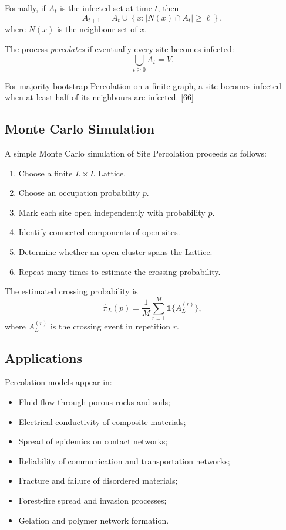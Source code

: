 \documentclass[a4paper, 10pt, onepage]{elegantbook}
\begin{document}
{Formally, if \(A_t\) is the infected set at time \(t\), then
\[
A_{t+1}
=
A_t
\cup
\left\{
x:
|N(x)\cap A_t|\ge\ell
\right\},
\]
where \(N(x)\) is the neighbour set of \(x\).

The process \emph{percolates} if eventually every site becomes infected:
\[
\bigcup_{t\ge0}A_t=V.
\]

For majority bootstrap Percolation on a finite graph, a site becomes infected
when at least half of its neighbours are infected. [66]

\subsection{Monte Carlo Simulation}

A simple Monte Carlo simulation of Site Percolation proceeds as follows:

\begin{enumerate}
\item Choose a finite \(L\times L\) Lattice.
\item Choose an occupation probability \(p\).
\item Mark each site open independently with probability \(p\).
\item Identify connected components of open sites.
\item Determine whether an open cluster spans the Lattice.
\item Repeat many times to estimate the crossing probability.
\end{enumerate}

The estimated crossing probability is
\[
\widehat\pi_L(p)
=
\frac{1}{M}
\sum_{r=1}^{M}
\mathbf 1\{A_L^{(r)}\},
\]
where \(A_L^{(r)}\) is the crossing event in repetition \(r\).

\subsection{Applications}

Percolation models appear in:

\begin{itemize}
\item Fluid flow through porous rocks and soils;
\item Electrical conductivity of composite materials;
\item Spread of epidemics on contact networks;
\item Reliability of communication and transportation networks;
\item Fracture and failure of disordered materials;
\item Forest-fire spread and invasion processes;
\item Gelation and polymer network formation.
\end{itemize}

}
\end{document}
